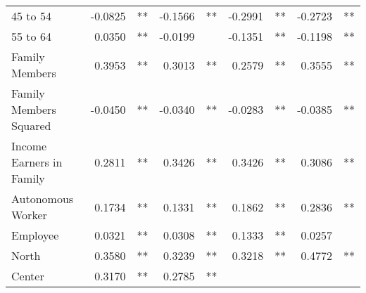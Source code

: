 \documentclass[12pt]{article}
\begin{document}
\begin{table}[!h]
\begin{tabular}{lllllllll}
\multicolumn{1}{l}{45 to 54} &
  \multicolumn{1}{r}{-0.0825} &
  \multicolumn{1}{l}{**} &
  \multicolumn{1}{r}{-0.1566} &
  \multicolumn{1}{l}{**} &
  \multicolumn{1}{r}{-0.2991} &
  \multicolumn{1}{l}{**} &
  \multicolumn{1}{r}{-0.2723} &
  \multicolumn{1}{l}{**} \\
\multicolumn{1}{l}{55 to 64} &
  \multicolumn{1}{r}{0.0350} &
  \multicolumn{1}{l}{**} &
  \multicolumn{1}{r}{-0.0199} &
  \multicolumn{1}{l}{} &
  \multicolumn{1}{r}{-0.1351} &
  \multicolumn{1}{l}{**} &
  \multicolumn{1}{r}{-0.1198} &
  \multicolumn{1}{l}{**} \\
\multicolumn{1}{l}{Family Members} &
  \multicolumn{1}{r}{0.3953} &
  \multicolumn{1}{l}{**} &
  \multicolumn{1}{r}{0.3013} &
  \multicolumn{1}{l}{**} &
  \multicolumn{1}{r}{0.2579} &
  \multicolumn{1}{l}{**} &
  \multicolumn{1}{r}{0.3555} &
  \multicolumn{1}{l}{**} \\
\multicolumn{1}{l}{Family Members Squared} &
  \multicolumn{1}{r}{-0.0450} &
  \multicolumn{1}{l}{**} &
  \multicolumn{1}{r}{-0.0340} &
  \multicolumn{1}{l}{**} &
  \multicolumn{1}{r}{-0.0283} &
  \multicolumn{1}{l}{**} &
  \multicolumn{1}{r}{-0.0385} &
  \multicolumn{1}{l}{**} \\
\multicolumn{1}{l}{Income Earners in Family} &
  \multicolumn{1}{r}{0.2811} &
  \multicolumn{1}{l}{**} &
  \multicolumn{1}{r}{0.3426} &
  \multicolumn{1}{l}{**} &
  \multicolumn{1}{r}{0.3426} &
  \multicolumn{1}{l}{**} &
  \multicolumn{1}{r}{0.3086} &
  \multicolumn{1}{l}{**} \\
\multicolumn{1}{l}{Autonomous Worker} &
  \multicolumn{1}{r}{0.1734} &
  \multicolumn{1}{l}{**} &
  \multicolumn{1}{r}{0.1331} &
  \multicolumn{1}{l}{**} &
  \multicolumn{1}{r}{0.1862} &
  \multicolumn{1}{l}{**} &
  \multicolumn{1}{r}{0.2836} &
  \multicolumn{1}{l}{**} \\
\multicolumn{1}{l}{Employee} &
  \multicolumn{1}{r}{0.0321} &
  \multicolumn{1}{l}{**} &
  \multicolumn{1}{r}{0.0308} &
  \multicolumn{1}{l}{**} &
  \multicolumn{1}{r}{0.1333} &
  \multicolumn{1}{l}{**} &
  \multicolumn{1}{r}{0.0257} &
  \multicolumn{1}{l}{} \\
\multicolumn{1}{l}{North} &
  \multicolumn{1}{r}{0.3580} &
  \multicolumn{1}{l}{**} &
  \multicolumn{1}{r}{0.3239} &
  \multicolumn{1}{l}{**} &
  \multicolumn{1}{r}{0.3218} &
  \multicolumn{1}{l}{**} &
  \multicolumn{1}{r}{0.4772} &
  \multicolumn{1}{l}{**} \\
\multicolumn{1}{l}{Center} &
  \multicolumn{1}{r}{0.3170} &
  \multicolumn{1}{l}{**} &
  \multicolumn{1}{r}{0.2785} &
  \multicolumn{1}{l}{**} &

\end{tabular}
\end{table}
\end{document}

